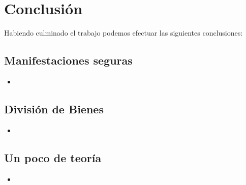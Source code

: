 \section{Conclusión}
Habiendo culminado el trabajo podemos efectuar las siguientes conclusiones:
 \subsection{Manifestaciones seguras}    
\begin{itemize}
    \item 
\end{itemize}
 \subsection{División de Bienes}    
\begin{itemize}
    \item 
\end{itemize}
\subsection{Un poco de teoría}    
\begin{itemize}
    \item 
\end{itemize}
